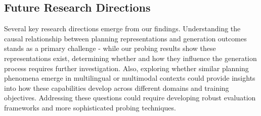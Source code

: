 
\subsection{Future Research Directions}
Several key research directions emerge from our findings. Understanding the causal relationship between planning representations and generation outcomes stands as a primary challenge - while our probing results show these representations exist, determining whether and how they influence the generation process requires further investigation. Also, exploring whether similar planning phenomena emerge in multilingual or multimodal contexts could provide insights into how these capabilities develop across different domains and training objectives. Addressing these questions could require developing robust evaluation frameworks and more sophisticated probing techniques.